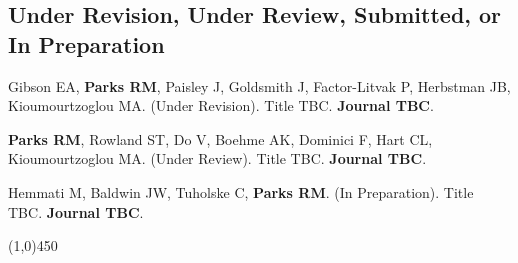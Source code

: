\subsection*{Under Revision, Under Review, Submitted, or In Preparation}

\noindent Gibson EA, \textbf{Parks RM}, Paisley J, Goldsmith J, Factor-Litvak P, Herbstman JB, Kioumourtzoglou MA. (Under Revision). Title TBC. \textbf{Journal TBC}. \bigskip

\noindent \textbf{Parks RM}, Rowland ST, Do V, Boehme AK, Dominici F, Hart CL, Kioumourtzoglou MA. (Under Review). Title TBC. \textbf{Journal TBC}. \bigskip

\noindent Hemmati M, Baldwin JW, Tuholske C, \textbf{Parks RM}. (In Preparation). Title TBC. \textbf{Journal TBC}. \bigskip


											
\begin{center} \line(1,0){450} \end{center}